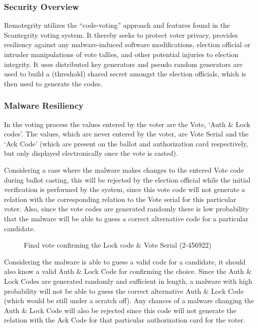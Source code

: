 \subsubsection{Security Overview}

Remotegrity utilizes the ``code-voting'' approach and features found in the Scantegrity voting system. It thereby seeks to protect voter privacy, provides resiliency against any malware-induced software modifications, election official or intruder manipulations of vote tallies, and other potential injuries to election integrity. It uses distributed key generators and pseudo random generators are used to build a (threshold) shared secret amongst the election officials, which is then used to generate the codes.

\subsubsection{Malware Resiliency}

In the voting process the values entered by the voter are the Vote, `Auth \& Lock codes'. The values, which are never entered by the voter, are Vote Serial and the `Ack Code' (which are present on the ballot and authorization card respectively, but only displayed electronically once the vote is casted).

Considering a case where the malware makes changes to the entered Vote code during ballot casting, this will be rejected by the election official while the initial verification is performed by the system, since this vote code will not generate a relation with the corresponding relation to the Vote serial for this particular voter. Also, since the vote codes are generated randomly there is low probability that the malware will be able to guess a correct alternative code for a particular candidate.

\begin{figure}
  \centering
  \caption{Final vote confirming the Lock code \& Vote Serial (2-456922)}
  \label{fig:remotegrity-lock}
\end{figure}

Considering the malware is able to guess a valid code for a candidate, it should also know a valid Auth \& Lock Code for confirming the choice. Since the Auth \& Lock Codes are generated randomly and sufficient in length, a malware with high probability will not be able to guess the correct alternative Auth \& Lock Code (which would be still under a scratch off). Any chances of a malware changing the Auth \& Lock Code will also be rejected since this code will not generate the relation with the Ack Code for that particular authorization card for the voter.

